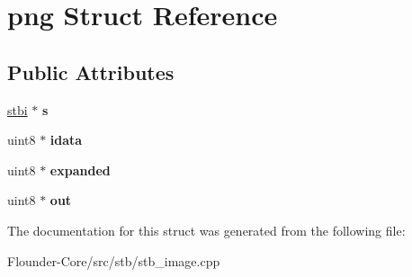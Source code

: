 \hypertarget{structpng}{}\section{png Struct Reference}
\label{structpng}
\subsection*{Public Attributes}
\begin{DoxyCompactItemize}
\item 
\mbox{\label{structpng_a77d3bfd0ae8f598a475317ed39e78fd0}} 
\hyperlink{structstbi}{stbi} $\ast$ {\bfseries s}
\item 
\mbox{\label{structpng_a5cd944fdf0f0417a344bcc538ed98ed6}} 
uint8 $\ast$ {\bfseries idata}
\item 
\mbox{\label{structpng_a474dd0da8ac0347924e68f5de7e68c55}} 
uint8 $\ast$ {\bfseries expanded}
\item 
\mbox{\label{structpng_ada33c39620ad9a647c088c40d21887f6}} 
uint8 $\ast$ {\bfseries out}
\end{DoxyCompactItemize}


The documentation for this struct was generated from the following file\+:\begin{DoxyCompactItemize}
\item 
Flounder-\/\+Core/src/stb/stb\+\_\+image.\+cpp\end{DoxyCompactItemize}
